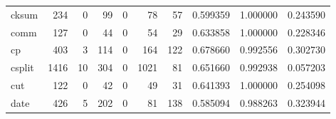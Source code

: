 \begin{longtable}{lrrrrrrrrr}
cksum     &                                                234 &                                                  0 &                                                 99 &                                                  0 &                                                 78 &                                                 57 &                                           0.599359 &                               1.000000 &                             0.243590 \\
comm      &                                                127 &                                                  0 &                                                 44 &                                                  0 &                                                 54 &                                                 29 &                                           0.633858 &                               1.000000 &                             0.228346 \\
cp        &                                                403 &                                                  3 &                                                114 &                                                  0 &                                                164 &                                                122 &                                           0.678660 &                               0.992556 &                             0.302730 \\
csplit    &                                               1416 &                                                 10 &                                                304 &                                                  0 &                                               1021 &                                                 81 &                                           0.651660 &                               0.992938 &                             0.057203 \\
cut       &                                                122 &                                                  0 &                                                 42 &                                                  0 &                                                 49 &                                                 31 &                                           0.641393 &                               1.000000 &                             0.254098 \\
date      &                                                426 &                                                  5 &                                                202 &                                                  0 &                                                 81 &                                                138 &                                           0.585094 &                               0.988263 &                             0.323944 \\

\end{longtable}
